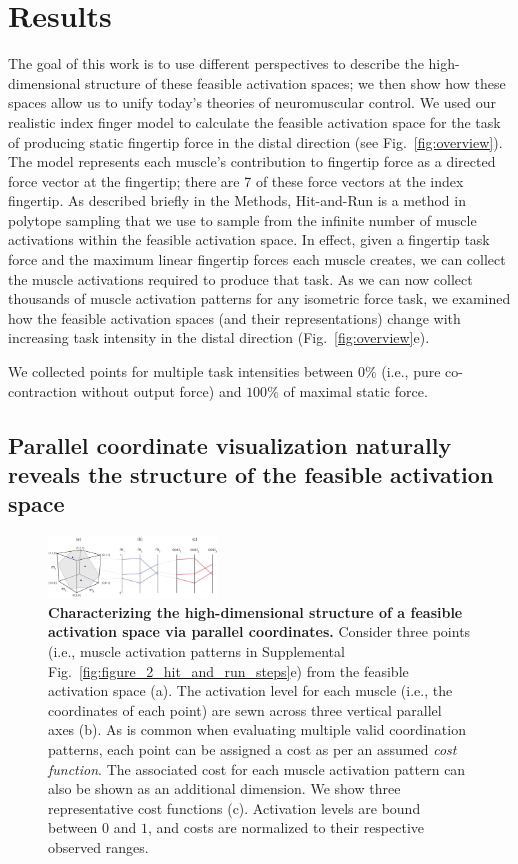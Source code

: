 \documentclass[9pt,twocolumn,twoside,lineno]{pnas-new}
\begin{document}
\section*{Results}

The goal of this work is to use different perspectives to describe the high-dimensional structure of these feasible activation spaces; we then show how these spaces allow us to unify today’s theories of neuromuscular control. We used our realistic index finger model to calculate the feasible activation space for the task of producing static fingertip force in the distal direction (see Fig.~\ref{fig:overview}). The model represents each muscle's contribution to fingertip force as a directed force vector at the fingertip; there are 7 of these force vectors at the index fingertip.
As described briefly in the Methods, Hit-and-Run is a method in polytope sampling that we use to sample from the infinite number of muscle activations within the feasible activation space. In effect, given a fingertip task force and the maximum linear fingertip forces each muscle creates, we can collect the muscle activations required to produce that task. As we can now collect thousands of muscle activation patterns for any isometric force task, we examined how the feasible activation spaces (and their representations) change with increasing task intensity in the distal direction (Fig.~\ref{fig:overview}e).

We collected points for multiple task intensities between $0\%$ (i.e., pure co-contraction without output force) and $100\%$ of maximal static force.


\subsection*{Parallel coordinate visualization naturally reveals the structure of the feasible activation space}


\begin{figure}[htbp]
 \centering
 \includegraphics[width=0.4\textwidth]{numbered_figures/figure_3_parcoord_schematic.pdf}
 \caption{\textbf{Characterizing the high-dimensional structure of a feasible activation space via parallel coordinates.} Consider three points (i.e., muscle activation patterns in Supplemental Fig.~\ref{fig:figure_2_hit_and_run_steps}e) from the feasible activation space (a). The activation level for each muscle (i.e., the coordinates of each point) are sewn across three vertical parallel axes (b). As is common when evaluating multiple valid coordination patterns, each point can be assigned a cost as per an assumed \emph{cost function}. The associated cost for each muscle activation pattern can also be shown as an additional dimension. We show three representative cost functions (c). Activation levels are bound between $0$ and $1$, and costs are normalized to their respective observed ranges.}
 \label{fig:points_to_parcoords_mapping}
\end{figure}
\end{document}
